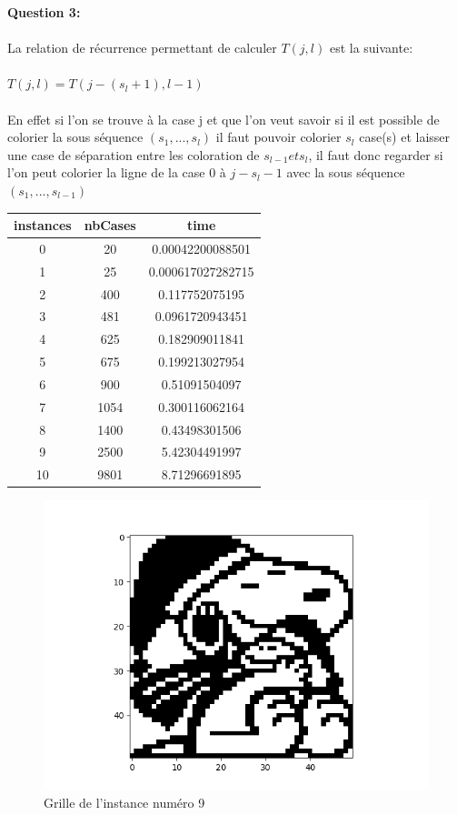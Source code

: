 \documentclass[a4paper]{memoir}
\begin{document}
 	
 	\textbf{Question 3:}\\\\
 	La relation de récurrence permettant de calculer $T(j,l)$ est la suivante:\\\\
 	$T(j, l) = T(j-(s_{l}+1),l-1)$\\\\
 	En effet si l'on se trouve à la case j et que l'on veut savoir si il est possible de colorier la sous séquence $(s_{1}, ..., s_{l})$ il faut pouvoir colorier $s_{l}$ case(s) et laisser une case de séparation entre les coloration de $s_{l-1} et s_{l}$, il faut donc regarder si l'on peut colorier la ligne de la case 0 à $j - s_{l} - 1$ avec la sous séquence $(s_{1}, ..., s_{l-1})$
   

        

\begin{tabular}{|c||c||c|}
\hline
instances & nbCases & time \\ 
\hline
0 & 20 & 0.00042200088501 \\ 
\hline
1 & 25 & 0.000617027282715 \\ 
\hline
2 & 400 & 0.117752075195 \\ 
\hline
3 & 481 & 0.0961720943451 \\ 
\hline
4 & 625 & 0.182909011841 \\ 
\hline
5 & 675 & 0.199213027954 \\ 
\hline
6 & 900 & 0.51091504097 \\ 
\hline
7 & 1054 & 0.300116062164 \\ 
\hline
8 & 1400 & 0.43498301506 \\ 
\hline
9 & 2500 & 5.42304491997 \\ 
\hline
10 & 9801 & 8.71296691895 \\ 
\hline
\end{tabular}


\begin{figure}[h]
  \centering
  \includegraphics[width=0.75\linewidth]{../images/dynamique_instance9.png}
  \caption{Grille de l'instance numéro 9}
  \label{fig:instance9}
\end{figure}
\end{document}
